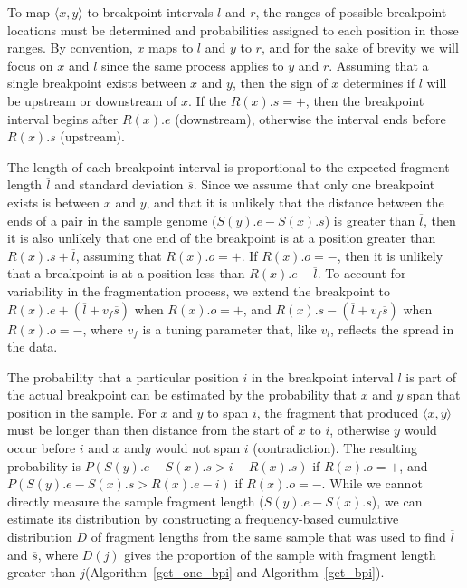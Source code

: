 \documentclass[11pt]{article}
\begin{document}
To map $\langle x,y \rangle$ to breakpoint intervals $l$ and $r$, the ranges of
possible breakpoint locations must be determined and probabilities assigned to
each position in those ranges.  By convention, $x$ maps to $l$ and $y$ to
$r$, and for the sake of brevity we will focus on $x$ and $l$ since the same
process applies to $y$ and $r$.  Assuming that a single breakpoint exists
between $x$ and $y$, then the sign of $x$ determines if $l$ will be upstream
or downstream of $x$.  If the $R(x).s=+$, then the breakpoint interval begins
after $R(x).e$ (downstream), otherwise the interval ends before $R(x).s$
(upstream).  

The length of each breakpoint interval is proportional to the expected fragment
length $\overline{l}$ and standard deviation $\overline{s}$.  Since we assume
that only one breakpoint exists is between $x$ and $y$, and that it is unlikely
that the distance between the ends of a pair in the sample genome ($S(y).e -
S(x).s$) is greater than $\overline{l}$, then it is also unlikely that one end
of the breakpoint is at a position greater than $R(x).s + \overline{l}$,
assuming that $R(x).o=+$. If $R(x).o=-$, then it is unlikely that a breakpoint
is at a position less than $R(x).e - \overline{l}$.  To account for variability
in the fragmentation process, we extend the breakpoint to 
$R(x).e + (\overline{l} + v_f\overline{s})$ when $R(x).o=+$, and 
$R(x).s - (\overline{l} + v_f\overline{s})$ when $R(x).o=-$, 
where $v_f$ is a tuning parameter that, like $v_l$, reflects the spread in the
data.

The probability that a particular position $i$ in the breakpoint interval $l$ is
part of the actual breakpoint can be estimated by the probability that $x$ and
$y$ span that position in the sample. For $x$ and $y$ to span $i$, the fragment
that produced $\langle x,y \rangle$ must be longer than then distance from the
start of $x$ to $i$, otherwise $y$ would occur before $i$ and $x$ and$y$ would
not span $i$ (contradiction).  The resulting probability is 
$P(S(y).e - S(x).s > i - R(x).s)$ if $R(x).o=+$, and 
$P(S(y).e - S(x).s > R(x).e - i)$ if $R(x).o=-$.
While we cannot directly measure the sample fragment length ($S(y).e - S(x).s$),
we can estimate its distribution by constructing a frequency-based cumulative
distribution $D$ of fragment lengths from the same sample that was used to find
$\overline{l}$ and $\overline{s}$, where $D(j)$ gives the proportion of the
sample with fragment length greater than $j$(Algorithm~\ref{get_one_bpi} and
Algorithm~\ref{get_bpi}).
\end{document}
